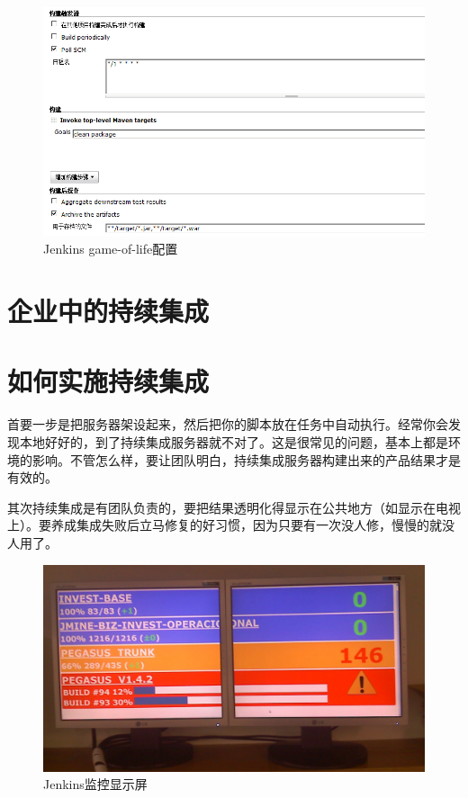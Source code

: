 \begin{figure}[htbp]
\centering
\includegraphics[keepaspectratio,width=\textwidth,height=0.75\textheight]{img/18333fig0305-tn.png}
\caption{Jenkins game-of-life配置}
\end{figure}

\section{企业中的持续集成}
\label{企业中的持续集成}

\section{如何实施持续集成}
\label{如何实施持续集成}

首要一步是把服务器架设起来，然后把你的脚本放在任务中自动执行。经常你会发现本地好好的，到了持续集成服务器就不对了。这是很常见的问题，基本上都是环境的影响。不管怎么样，要让团队明白，持续集成服务器构建出来的产品结果才是有效的。

其次持续集成是有团队负责的，要把结果透明化得显示在公共地方（如显示在电视上）。要养成集成失败后立马修复的好习惯，因为只要有一次没人修，慢慢的就没人用了。

\begin{figure}[htbp]
\centering
\includegraphics[keepaspectratio,width=\textwidth,height=0.75\textheight]{img/18333fig0306-tn.png}
\caption{Jenkins监控显示屏}
\end{figure}

